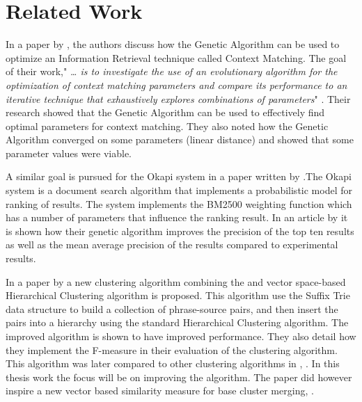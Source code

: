 \section{Related Work}
\label{RelatedWork}
In  a paper by \citeauthor{Zakos2005}, the authors discuss how the Genetic Algorithm can be used to optimize an Information Retrieval technique called Context Matching. The goal of their work," \textit{{\dots} is to investigate the use of an evolutionary algorithm for the optimization of context matching parameters and compare its performance to an iterative technique that exhaustively explores combinations of parameters}" \cite[582]{Zakos2005}. Their research showed that the Genetic Algorithm can be used to effectively find optimal parameters for context matching. They also noted how the Genetic Algorithm converged on some parameters (linear distance) and showed that some parameter values were viable.

A similar goal is pursued for the Okapi system in a paper written by \cite{Chuan2003}.The Okapi system is a document search algorithm that implements a probabilistic model for ranking of results. The system implements the BM2500 weighting function which has a number of parameters that influence the ranking result. In an article by \cite{Chuan2003} it is shown how their genetic algorithm improves the precision of the top ten results as well as the mean average precision of the results compared to experimental results.


In a paper by \cite{Chim2007} a new clustering algorithm combining the \STC and vector space-based Hierarchical Clustering algorithm is proposed. This algorithm use the Suffix Trie data structure to build a collection of phrase-source pairs, and then insert the pairs into a hierarchy using the standard Hierarchical Clustering algorithm. The improved algorithm is shown to have improved performance. They also detail how they implement the F-measure in their evaluation of the clustering algorithm. This algorithm was later compared to other clustering algorithms in , \cite{Chim2008}. In this thesis work the focus will be on improving the \CTC algorithm. The paper did however inspire a new vector based similarity measure for base cluster merging, \cite{Moe2013}.